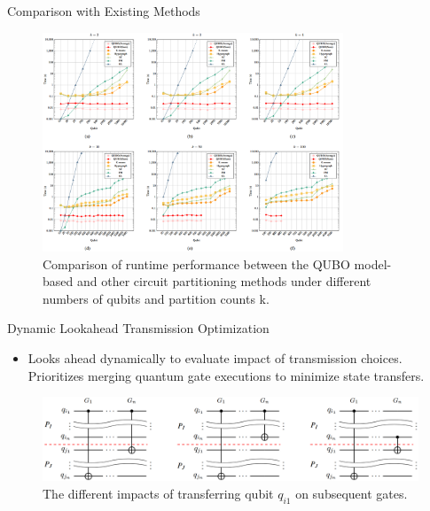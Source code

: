 \documentclass{beamer}
\begin{document}
	\begin{frame}{Comparison with Existing Methods}
		\begin{figure}
			\includegraphics[width=0.8\textwidth]{figure/time.png}  %
			\caption{Comparison of runtime performance between the QUBO model-based and other circuit partitioning methods under different numbers of qubits and partition counts k.}
		\end{figure}
	\end{frame}
	
	\begin{frame}{Dynamic Lookahead Transmission Optimization}
		\begin{itemize}
			\item Looks ahead dynamically to evaluate impact of transmission choices. Prioritizes merging quantum gate executions to minimize state transfers.
		\end{itemize}
		\begin{figure}
			\includegraphics[width=.9\textwidth]{figure/transfer.png}
			\caption{The different impacts of transferring qubit $q_{i1}$ on subsequent gates.}
		\end{figure}
	\end{frame}
	
\end{document}
